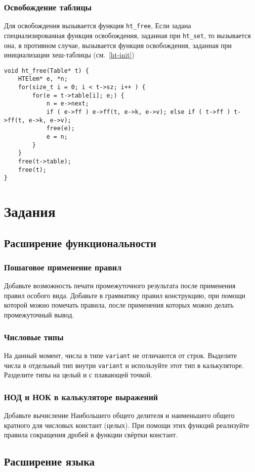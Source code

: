 \documentclass[10pt]{report}
\begin{document}
\subsection{Освобождение таблицы}
Для освобождения вызывается функция {\tt ht\_free}, Если задана специализированная функция освобождения, заданная при {\tt ht\_set}, то вызывается она, в противном случае, вызывается функция освобождения, заданная при инициализации хеш-таблицы (см.~\ref{ht-init}) 
\begin{lstlisting}[firstnumber=81]
void ht_free(Table* t) {
	HTElem* e, *n;
	for(size_t i = 0; i < t->sz; i++ ) {
		for(e = t->table[i]; e;) {
			n = e->next;
			if ( e->ff ) e->ff(t, e->k, e->v); else if ( t->ff ) t->ff(t, e->k, e->v);
			free(e);
			e = n;
		}
	}
	free(t->table);
	free(t);
}
\end{lstlisting}

\chapter{Задания}
\section{Расширение функциональности}
\subsection{Пошаговое применение правил}
Добавьте возможность печати промежуточного результата после применения правил особого вида.
Добавьте в грамматику правил конструкцию, при помощи которой можно помечать правила, после применения которых можно делать промежуточный вывод.
\subsection{Числовые типы}
На данный момент, числа в типе \verb|variant| не отличаются от строк. Выделите числа в отдельный тип внутри \verb|variant| и используйте этот тип в калькуляторе. Разделите типы на целый и с плавающей точкой.
\subsection{НОД и НОК в калькуляторе выражений}
Добавьте вычисление Наибольшего общего делителя и наименьшего общего кратного для числовых констант (целых). При помощи этих функций реализуйте правила сокращения дробей в функции свёртки констант.
\section{Расширение языка}
\end{document}
